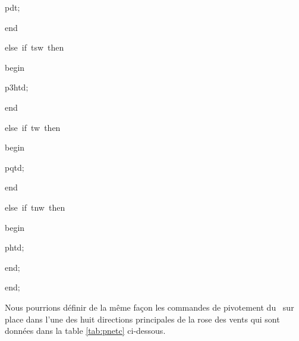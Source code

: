 {\vspace{\neglskip}\mbox{\blc  \blk\blk\blk\blk\idt  pdt$;$\ }\par 
\vspace{\neglskip}\mbox{\blc  \blk\blk\blk\idt  \mcl end\idt }\par 
\pagebreak[3] 
\vspace{\neglskip}\mbox{\blc  \blk\blk\idt  \mcl else\idt \ \mcl if\idt \ tsw\ \mcl then\idt }\par 
\vspace{\neglskip}\mbox{\blc  \blk\blk\blk\idt  \mcl begin\idt }\par 
\vspace{\neglskip}\mbox{\blc  \blk\blk\blk\blk\idt  p3htd$;$\ }\par 
\vspace{\neglskip}\mbox{\blc  \blk\blk\blk\idt  \mcl end\idt }\par 
\pagebreak[3] 
\vspace{\neglskip}\mbox{\blc  \blk\blk\idt  \mcl else\idt \ \mcl if\idt \ tw\ \mcl then\idt }\par 
\vspace{\neglskip}\mbox{\blc  \blk\blk\blk\idt  \mcl begin\idt }\par 
\vspace{\neglskip}\mbox{\blc  \blk\blk\blk\blk\idt  pqtd$;$\ }\par 
\vspace{\neglskip}\mbox{\blc  \blk\blk\blk\idt  \mcl end\idt }\par 
\pagebreak[3] 
\vspace{\neglskip}\mbox{\blc  \blk\blk\idt  \mcl else\idt \ \mcl if\idt \ tnw\ \mcl then\idt }\par 
\vspace{\neglskip}\mbox{\blc  \blk\blk\blk\idt  \mcl begin\idt }\par 
\vspace{\neglskip}\mbox{\blc  \blk\blk\blk\blk\idt  phtd$;$\ }\par 
\vspace{\neglskip}\mbox{\blc  \blk\blk\blk\idt  \mcl end\idt $;$\ }\par 
\vspace{\neglskip}\mbox{\blc  \blk\idt  \mcl end\idt $;$}\par 
\medskip
}

\noindent Nous pourrions définir de la même façon les  commandes de pivotement du \robot\
sur place dans l'une des huit directions principales de la rose des vents qui sont données dans la table
\ref{tab:pnetc} ci-dessous.

